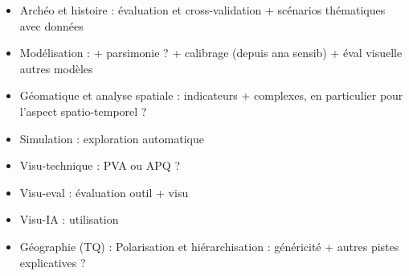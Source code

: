 \begin{itemize}
	\item Archéo et histoire : évaluation et cross-validation + scénarios thématiques avec données
	\item Modélisation : + parsimonie ? + calibrage (depuis ana sensib) + éval visuelle autres modèles
	\item Géomatique et analyse spatiale : indicateurs + complexes, en particulier pour l'aspect spatio-temporel ?
	\item Simulation : exploration automatique
	\item Visu-technique : PVA ou APQ ?
	\item Visu-eval : évaluation outil + visu
	\item Visu-IA : utilisation
	\item Géographie (TQ) : Polarisation et hiérarchisation : généricité + autres pistes explicatives ?
\end{itemize}
